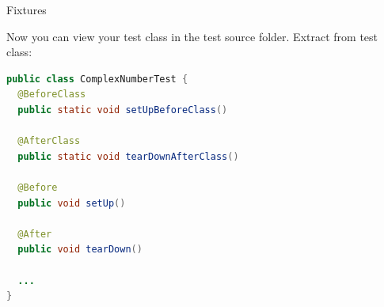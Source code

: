 \documentclass[11pt, xcolor=svgnames]{beamer}
\begin{document}





\begin{frame}[fragile]{Fixtures}

Now you can view your test class in the test source folder. Extract from test class:

\begin{center}
\begin{lstlisting}[language=Java,basicstyle=\scriptsize]
public class ComplexNumberTest {
  @BeforeClass
  public static void setUpBeforeClass()

  @AfterClass
  public static void tearDownAfterClass()

  @Before
  public void setUp()

  @After
  public void tearDown()
  
  ...
}
\end{lstlisting}
\end{center}

\end{frame}

 


%
\end{document}
